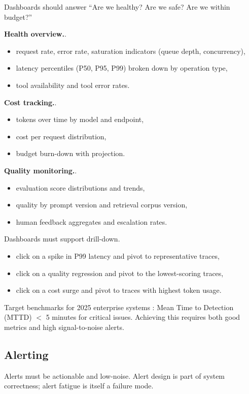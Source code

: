 Dashboards should answer ``Are we healthy? Are we safe? Are we within budget?''

\textbf{Health overview.}.
\begin{itemize}
\item request rate, error rate, saturation indicators (queue depth, concurrency),
\item latency percentiles (P50, P95, P99) broken down by operation type,
\item tool availability and tool error rates.
\end{itemize}

\textbf{Cost tracking.}.
\begin{itemize}
\item tokens over time by model and endpoint,
\item cost per request distribution,
\item budget burn-down with projection.
\end{itemize}

\textbf{Quality monitoring.}.
\begin{itemize}
\item evaluation score distributions and trends,
\item quality by prompt version and retrieval corpus version,
\item human feedback aggregates and escalation rates.
\end{itemize}

Dashboards must support drill-down.
\begin{itemize}
\item click on a spike in P99 latency and pivot to representative traces,
\item click on a quality regression and pivot to the lowest-scoring traces,
\item click on a cost surge and pivot to traces with highest token usage.
\end{itemize}

Target benchmarks for 2025 enterprise systems \cite{guardrails2025}: Mean Time to Detection (MTTD) $<$ 5 minutes for critical issues. Achieving this requires both good metrics and high signal-to-noise alerts.

\subsection{Alerting}

Alerts must be actionable and low-noise. Alert design is part of system correctness; alert fatigue is itself a failure mode.

